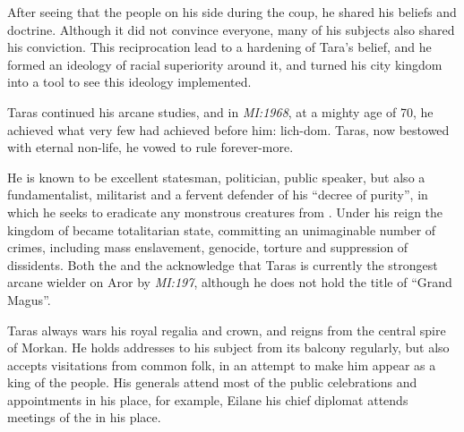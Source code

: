 After seeing that the people on his side during the coup, he shared his beliefs
and doctrine. Although it did not convince everyone, many of his subjects also
shared his conviction. This reciprocation lead to a hardening of Tara's belief,
and he formed an ideology of racial superiority around it, and turned his city
kingdom into a tool to see this ideology implemented.

Taras continued his arcane studies, and in \emph{MI:1968}, at a mighty age of
70, he achieved what very few had achieved before him: lich-dom. Taras, now
bestowed with eternal non-life, he vowed to rule forever-more.

He is known to be excellent statesman, politician, public speaker, but also a
fundamentalist, militarist and a fervent defender of his ``decree of purity'',
in which he seeks to eradicate any monstrous creatures from
. Under his reign the kingdom of 
became totalitarian state, committing an unimaginable number of crimes,
including mass enslavement, genocide, torture and suppression of dissidents.
Both the  and the  acknowledge that Taras is currently the strongest arcane wielder
on Aror by \emph{MI:197}, although he does not hold the title of ``Grand
Magus''.

Taras always wars his royal regalia and crown, and reigns from the central
spire of Morkan. He holds addresses to his subject from its balcony regularly,
but also accepts visitations from common folk, in an attempt to make him
appear as a king of the people. His generals attend most of the public
celebrations and appointments in his place, for example, Eilane his chief
diplomat attends meetings of the  in his place.

